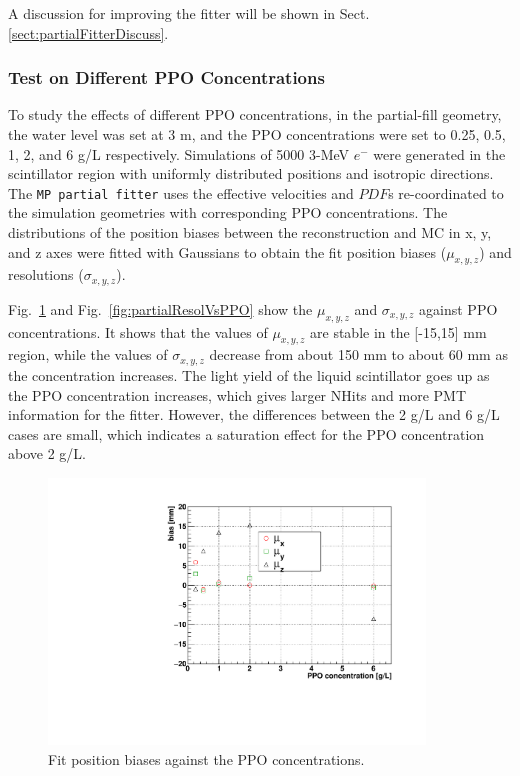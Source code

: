 A discussion for improving the fitter will be shown in Sect.\ref{sect:partialFitterDiscuss}.

\subsubsection{Test on Different PPO Concentrations}
To study the effects of different PPO concentrations, in the partial-fill geometry, the water level was set at 3 m, and the PPO concentrations were set to 0.25, 0.5, 1, 2, and 6 g/L respectively. Simulations of 5000 3-MeV $e^-$ were generated in the scintillator region with uniformly distributed positions and isotropic directions. The \texttt{MP partial fitter} uses the effective velocities and $PDF$s re-coordinated to the simulation geometries with corresponding PPO concentrations. The distributions of the position biases between the reconstruction and MC in x, y, and z axes were fitted with Gaussians to obtain the fit position biases ($\mu_{x,y,z}$) and resolutions ($\sigma_{x,y,z}$).

Fig.~\ref{fig:partialBiasVsPPO} and Fig.~\ref{fig:partialResolVsPPO} show the $\mu_{x,y,z}$ and $\sigma_{x,y,z}$ against PPO concentrations. It shows that the values of $\mu_{x,y,z}$ are stable in the [-15,15] mm region, while the values of $\sigma_{x,y,z}$ decrease from about 150 mm to about 60 mm as the concentration increases. The light yield of the liquid scintillator goes up as the PPO concentration increases, which gives larger NHits and more PMT information for the fitter. However, the differences between the 2 g/L and 6 g/L cases are small, which indicates a saturation effect for the PPO concentration above 2 g/L.

\begin{figure}[!htb]
	\centering
	\includegraphics[width=10cm]{partialBiasVsPPO.pdf}
	\caption{Fit position biases against the PPO concentrations.}
	\label{fig:partialBiasVsPPO}
\end{figure}

